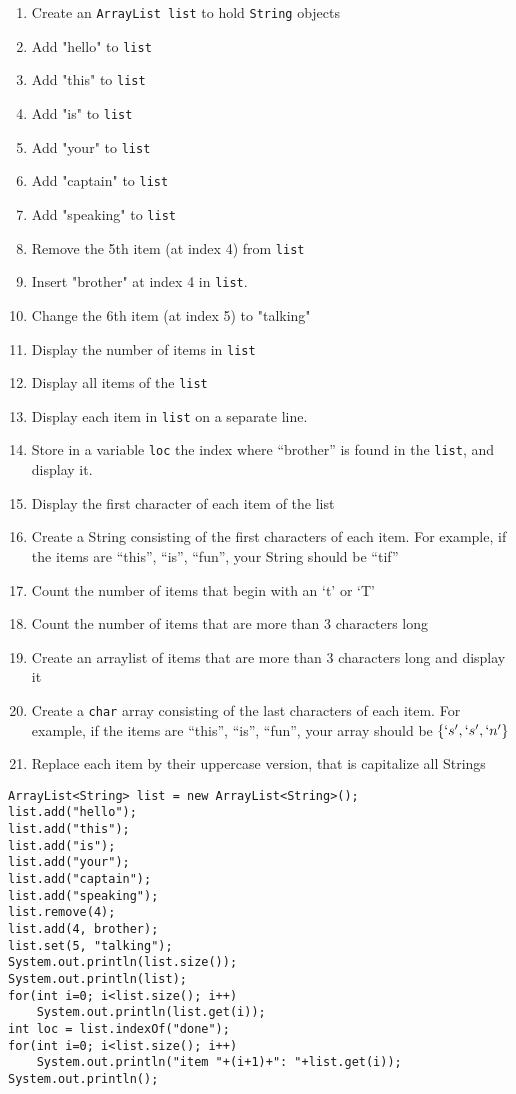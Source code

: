 \begin{questions}
\begin{enumerate}
	\item Create an \texttt{ArrayList list} to hold \texttt{String} objects
	\item Add "hello" to \texttt{list}
	\item Add "this" to \texttt{list}
	\item Add "is" to \texttt{list}
	\item Add "your" to \texttt{list}
	\item Add "captain" to \texttt{list}
	\item Add "speaking" to \texttt{list}
	\item Remove the 5th item (at index 4) from \texttt{list}
	\item Insert "brother" at index 4 in \texttt{list}.
	\item Change the 6th item (at index 5) to "talking"
	\item Display the number of items in \texttt{list}
	\item Display all items of the \texttt{list}
	\item Display each item in \texttt{list} on a separate line.
	\item Store in a variable \texttt{loc} the index where ``brother'' is found in the \texttt{list}, and display it.
	\item Display the first character of each item of the list
	\item Create a String consisting of the first characters of each item. For example, if the items are ``this'', ``is'', ``fun'', your String should be ``tif''
	\item Count the number of items that begin with an `t' or `T'
	\item Count the number of items that are more than 3 characters long
	\item Create an arraylist of items that are more than 3 characters long and display it
	\item Create a \texttt{char} array consisting of the last characters of each item. For example, if the items are ``this'', ``is'', ``fun'', your array should be $\{`s', `s', `n'\}$
	\item Replace each item by their uppercase version, that is capitalize all Strings
\end{enumerate}

\begin{solution}
\begin{lstlisting}
ArrayList<String> list = new ArrayList<String>();
list.add("hello");
list.add("this");
list.add("is");
list.add("your");
list.add("captain");
list.add("speaking");
list.remove(4);
list.add(4, brother);
list.set(5, "talking");
System.out.println(list.size());
System.out.println(list);
for(int i=0; i<list.size(); i++)
    System.out.println(list.get(i));
int loc = list.indexOf("done");
for(int i=0; i<list.size(); i++)
	System.out.println("item "+(i+1)+": "+list.get(i));
System.out.println();


\end{lstlisting}
\end{solution}
\end{questions}

